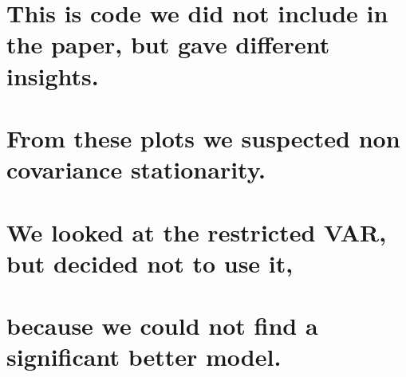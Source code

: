 \documentclass[]{article}
\newenvironment{Shaded}{\begin{snugshade}}{\end{snugshade}}
\newcommand{\KeywordTok}[1]{\textcolor[rgb]{0.13,0.29,0.53}{\textbf{#1}}}
\newcommand{\DecValTok}[1]{\textcolor[rgb]{0.00,0.00,0.81}{#1}}
\newcommand{\OperatorTok}[1]{\textcolor[rgb]{0.81,0.36,0.00}{\textbf{#1}}}
\newcommand{\NormalTok}[1]{#1}
\begin{document}
\section{This is code we did not include in the paper, but gave
different
insights.}\label{this-is-code-we-did-not-include-in-the-paper-but-gave-different-insights.}

\section{From these plots we suspected non covariance
stationarity.}\label{from-these-plots-we-suspected-non-covariance-stationarity.}

\begin{Shaded}
\end{Shaded}

\section{We looked at the restricted VAR, but decided not to use
it,}\label{we-looked-at-the-restricted-var-but-decided-not-to-use-it}

\section{because we could not find a significant better
model.}\label{because-we-could-not-find-a-significant-better-model.}
\end{document}

